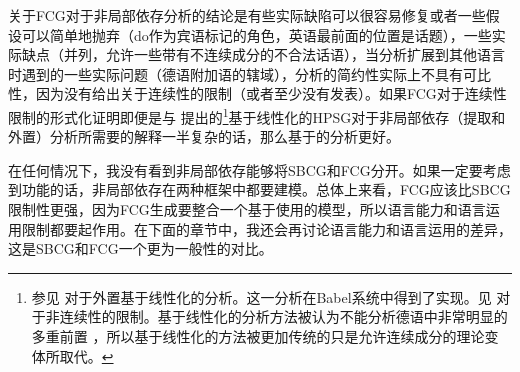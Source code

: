关于FCG对于非局部依存分析的结论是有些实际缺陷可以很容易修复或者一些假设可以简单地抛弃（do作为宾语标记的角色，英语最前面的位置是话题），一些实际缺点（并列，允许一些带有不连续成分的不合法话语），当分析扩展到其他语言时遇到的一些实际问题（德语附加语的辖域），分析的简约性实际上不具有可比性，因为没有给出关于连续性的限制（或者至少没有发表）。如果FCG对于连续性限制的形式化证明即便是与 \citet{Reape2000a}提出的\footnote{%
  参见 对于外置基于线性化的分析。这一分析在Babel系统中得到了实现\citep{Babel}。见\citet{Mueller99g} 对于非连续性的限制。基于线性化的分析方法被认为不能分析德语中非常明显的多重前置\citep{Mueller2005d,MuellerGS} ，所以基于线性化的方法被更加传统的只是允许连续成分的理论变体所取代。
}基于线性化的HPSG对于非局部依存（提取和外置）分析所需要的解释一半复杂的话，那么基于\slaschc 的分析更好。

在任何情况下，我没有看到非局部依存能够将SBCG和FCG分开。如果一定要考虑到功能的话，非局部依存在两种框架中都要建模。总体上来看，FCG应该比SBCG限制性更强，因为FCG生成要整合一个基于使用的模型，所以语言能力和语言运用限制都要起作用。在下面的章节中，我还会再讨论语言能力和语言运用的差异，这是SBCG和FCG一个更为一般性的对比。

